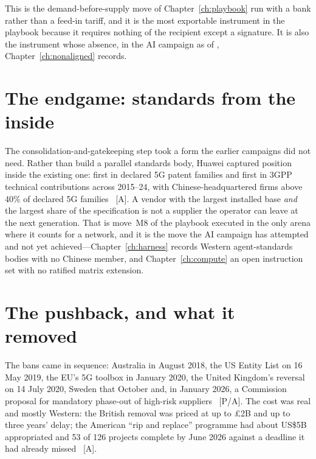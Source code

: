 This is the demand-before-supply move of Chapter~\ref{ch:playbook} run with a bank rather than a feed-in tariff, and it is the most exportable instrument in the playbook because it requires nothing of the recipient except a signature. It is also the instrument whose absence, in the AI campaign as of \datafreeze, Chapter~\ref{ch:nonaligned} records.

\section{The endgame: standards from the inside}

The consolidation-and-gatekeeping step took a form the earlier campaigns did not need. Rather than build a parallel standards body, Huawei captured position inside the existing one: first in declared 5G patent families and first in 3GPP technical contributions across 2015--24, with Chinese-headquartered firms above 40\% of declared 5G families~\cite{huawei-5g-seps} [A]. A vendor with the largest installed base \emph{and} the largest share of the specification is not a supplier the operator can leave at the next generation. That is move~M8 of the playbook executed in the only arena where it counts for a network, and it is the move the AI campaign has attempted and not yet achieved---Chapter~\ref{ch:harness} records Western agent-standards bodies with no Chinese member, and Chapter~\ref{ch:compute} an open instruction set with no ratified matrix extension.

\section{The pushback, and what it removed}

The bans came in sequence: Australia in August 2018, the US Entity List on 16 May 2019, the EU's 5G toolbox in January 2020, the United Kingdom's reversal on 14 July 2020, Sweden that October and, in January 2026, a Commission proposal for mandatory phase-out of high-risk suppliers~\cite{huawei-bans} [P/A]. The cost was real and mostly Western: the British removal was priced at up to \pounds2B and up to three years' delay; the American ``rip and replace'' programme had about US\$5B appropriated and 53 of 126 projects complete by June 2026 against a deadline it had already missed~\cite{huawei-bans} [A].

